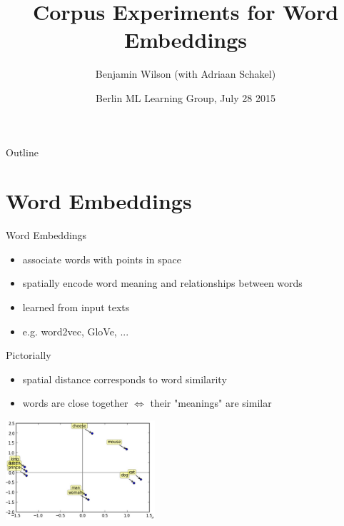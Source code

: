 \documentclass{beamer}
\title[Corpus Experiments]{Corpus Experiments for Word Embeddings}
\author
{Benjamin Wilson (with Adriaan Schakel)}
\date[Berlin ML Learning Group] %
{Berlin ML Learning Group, July 28 2015}
\begin{document}
\graphicspath{{../outputs/}}

\begin{frame}
  \titlepage
\end{frame}

\begin{frame}{Outline}
  \tableofcontents
\end{frame}

\section{Word Embeddings}

\begin{frame}{Word Embeddings}

\begin{itemize}
\item
associate words with points in space
\item
spatially encode word meaning and relationships between words
\item
learned from input texts
\item
e.g. word2vec, GloVe, ...
\end{itemize}

\end{frame}

\begin{frame}{Pictorially}
\begin{itemize}
\item spatial distance corresponds to word similarity
\item words are close together $\Leftrightarrow$ their "meanings" are similar
\end{itemize}
\begin{center}
    \includegraphics[height=140px]{semantic_similarity}\\
\end{center}
\end{frame}
\end{document}

